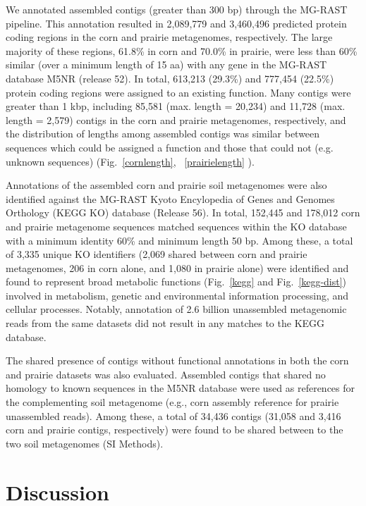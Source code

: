 \documentclass{pnastwo}
\begin{document}
\begin{article}
We annotated assembled contigs (greater than 300 bp) through the MG-RAST
pipeline. This annotation resulted in 2,089,779 and 3,460,496 predicted protein
coding regions in the corn and prairie metagenomes, respectively. The large
majority of these regions, 61.8\% in corn and 70.0\% in prairie, were less than 60\% similar (over a minimum length of 15 aa) with any gene in the MG-RAST
database M5NR (release 52). In total,
613,213 (29.3\%) and 777,454 (22.5\%) protein coding regions were assigned to an
existing function. Many contigs were greater than 1 kbp, including 85,581 (max.
length = 20,234) and 11,728 (max. length = 2,579) contigs in the corn and
prairie metagenomes, respectively, and the distribution of lengths among
assembled contigs was similar between sequences which could be assigned a
function and those that could not (e.g. unknown sequences) (Fig.~\ref{cornlength}, ~\ref{prairielength}
).

Annotations of the assembled corn and prairie soil metagenomes
were also identified against the MG-RAST Kyoto Encylopedia of Genes and Genomes
Orthology (KEGG KO) database (Release 56). In total, 152,445 and 178,012 corn
and prairie metagenome sequences matched sequences within the KO database with a
minimum identity 60\% and minimum length 50 bp. Among these, a total of 3,335
unique KO identifiers (2,069 shared between corn and prairie metagenomes, 206 in
corn alone, and 1,080 in prairie alone) were identified and found to represent
broad metabolic functions (Fig.~\ref{kegg} and Fig.~\ref{kegg-dist}) involved in
metabolism, genetic and environmental information processing, and cellular
processes. Notably, annotation of 2.6 billion unassembled metagenomic reads from the same
datasets did not result in any matches to the KEGG database. 


The shared presence of contigs without functional annotations in both the corn
and prairie datasets was also evaluated. Assembled contigs that shared no
homology to known sequences in the M5NR database were used as references for the
complementing soil metagenome (e.g., corn assembly reference for prairie
unassembled reads). Among these, a total of 34,436 contigs (31,058 and 3,416 corn and prairie contigs, respectively) were found to be shared between to the two soil metagenomes (SI Methods). 

\section*{Discussion}

\end{article}
\end{document}
